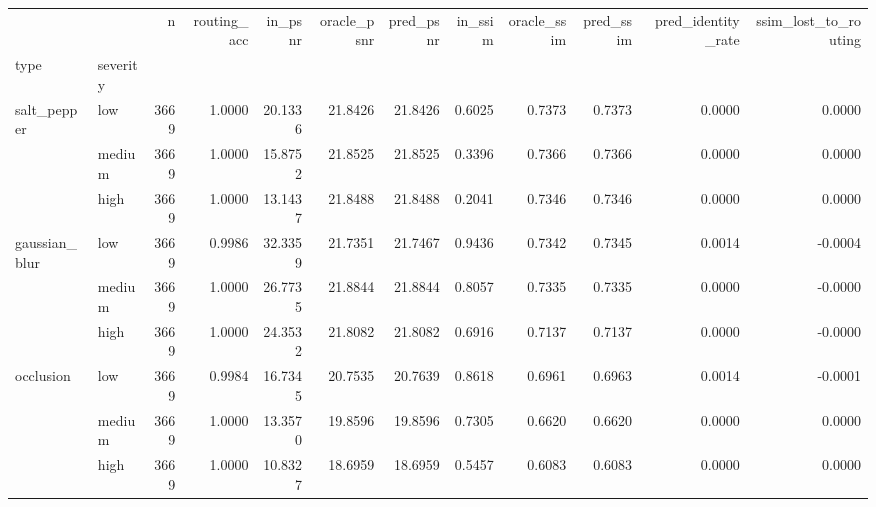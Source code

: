 \begin{tabular}{llrrrrrrrrrr}
\toprule
 &  & n & routing_acc & in_psnr & oracle_psnr & pred_psnr & in_ssim & oracle_ssim & pred_ssim & pred_identity_rate & ssim_lost_to_routing \\
type & severity &  &  &  &  &  &  &  &  &  &  \\
\midrule
\multirow[t]{3}{*}{salt_pepper} & low & 3669 & 1.0000 & 20.1336 & 21.8426 & 21.8426 & 0.6025 & 0.7373 & 0.7373 & 0.0000 & 0.0000 \\
 & medium & 3669 & 1.0000 & 15.8752 & 21.8525 & 21.8525 & 0.3396 & 0.7366 & 0.7366 & 0.0000 & 0.0000 \\
 & high & 3669 & 1.0000 & 13.1437 & 21.8488 & 21.8488 & 0.2041 & 0.7346 & 0.7346 & 0.0000 & 0.0000 \\
\cline{1-12}
\multirow[t]{3}{*}{gaussian_blur} & low & 3669 & 0.9986 & 32.3359 & 21.7351 & 21.7467 & 0.9436 & 0.7342 & 0.7345 & 0.0014 & -0.0004 \\
 & medium & 3669 & 1.0000 & 26.7735 & 21.8844 & 21.8844 & 0.8057 & 0.7335 & 0.7335 & 0.0000 & -0.0000 \\
 & high & 3669 & 1.0000 & 24.3532 & 21.8082 & 21.8082 & 0.6916 & 0.7137 & 0.7137 & 0.0000 & -0.0000 \\
\cline{1-12}
\multirow[t]{3}{*}{occlusion} & low & 3669 & 0.9984 & 16.7345 & 20.7535 & 20.7639 & 0.8618 & 0.6961 & 0.6963 & 0.0014 & -0.0001 \\
 & medium & 3669 & 1.0000 & 13.3570 & 19.8596 & 19.8596 & 0.7305 & 0.6620 & 0.6620 & 0.0000 & 0.0000 \\
 & high & 3669 & 1.0000 & 10.8327 & 18.6959 & 18.6959 & 0.5457 & 0.6083 & 0.6083 & 0.0000 & 0.0000 \\
\cline{1-12}
\bottomrule
\end{tabular}
